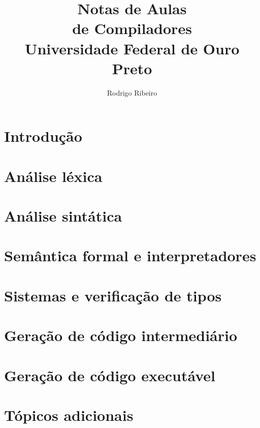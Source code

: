 \documentclass[10pt, a4paper, openany]{book}
\title{%
        \vspace{2cm}
        {\Huge\bfseries Notas de Aulas\\[0.5em] de Compiladores}\\[1em]
        \large Universidade Federal de Ouro Preto
}
\author{Rodrigo Ribeiro}
\date{}
\theoremstyle{remark}
\begin{document}
\maketitle
\tableofcontents
\newpage
\part{Introdução}

\part{Análise léxica}



\part{Análise sintática}







\part{Semântica formal e interpretadores}



\part{Sistemas e verificação de tipos}


\part{Geração de código intermediário}


\part{Geração de código executável}


% 
% 
% 
\part{Tópicos adicionais}



%
\end{document}

